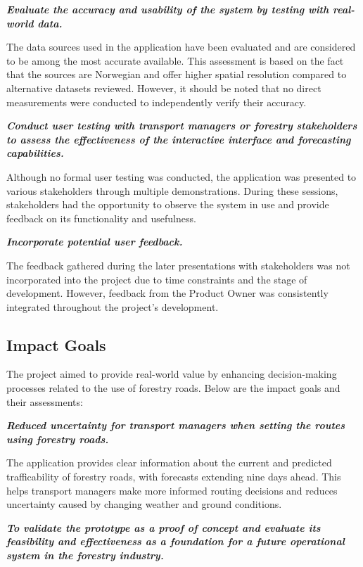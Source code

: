\textbf{\textit{Evaluate the accuracy and usability of the system by testing with real-world data.}}

The data sources used in the application have been evaluated and are considered to be among the most accurate available. This assessment is based on the fact that the sources are Norwegian and offer higher spatial resolution compared to alternative datasets reviewed. However, it should be noted that no direct measurements were conducted to independently verify their accuracy.

\textbf{\textit{Conduct user testing with transport managers or forestry stakeholders to assess the effectiveness of the interactive interface and forecasting capabilities.}}

Although no formal user testing was conducted, the application was presented to various stakeholders through multiple demonstrations. During these sessions, stakeholders had the opportunity to observe the system in use and provide feedback on its functionality and usefulness.

\textbf{\textit{Incorporate potential user feedback.}}

The feedback gathered during the later presentations with stakeholders was not incorporated into the project due to time constraints and the stage of development. However, feedback from the Product Owner was consistently integrated throughout the project's development.

\subsection{Impact Goals}

The project aimed to provide real-world value by enhancing decision-making processes related to the use of forestry roads. Below are the impact goals and their assessments:

\textbf{\textit{Reduced uncertainty for transport managers when setting the routes using forestry roads.}}

The application provides clear information about the current and predicted trafficability of forestry roads, with forecasts extending nine days ahead. This helps transport managers make more informed routing decisions and reduces uncertainty caused by changing weather and ground conditions.

\textbf{\textit{To validate the prototype as a proof of concept and evaluate its feasibility and effectiveness as a foundation for a future operational system in the forestry industry.}}

